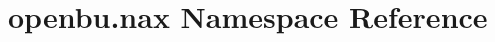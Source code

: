 \hypertarget{namespaceopenbu_1_1nax}{}\section{openbu.\+nax Namespace Reference}
\label{namespaceopenbu_1_1nax}
